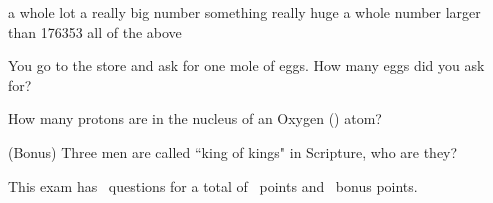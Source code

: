 \documentclass[11pt,addpoints]{exam}   	%
\begin{document}
\begin{questions}
\begin{choices}
\choice a whole lot
\choice a really big number
\choice something really huge
\choice a whole number larger than 176353
\choice all of the above
\end{choices}

\question[1]
You go to the store and ask for one mole of eggs. How many eggs did you ask for?

\question[1] 
How many protons are in the nucleus of an Oxygen () atom?

\bonusquestion[3]
(Bonus) Three men are called ``king of kings" in Scripture, who are they?

\end{questions}

\vspace{2in}

\begin{center}
This exam has \numquestions\ questions for a total of \numpoints\ points and \numbonuspoints\ bonus points.
\end{center}

\begin{center}
\gradetable[v][questions]
\end{center}
\end{document}
